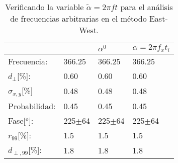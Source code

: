 \begin{table}[H]
    \begin{small}
        \begin{center}
            \begin{tabular}[c]{l|l|l|l|} \cline{2-4}
                                    & \cite{Aab_2020} & $\alpha^0$   & $\alpha=2\pi f_xt_i$   \\ \hline
                \multicolumn{1}{|l|}{Frecuencia:         }& 366.25          &  366.25      &  366.25            \\
                \multicolumn{1}{|l|}{$d_\perp$[\%]:      }& 0.60            &  0.60        &  0.60              \\
                \multicolumn{1}{|l|}{$\sigma_{x,y}$[\%]  }& 0.48            &  0.48        &  0.48              \\ 
                \multicolumn{1}{|l|}{Probabilidad:       }& 0.45            &  0.45        &  0.45              \\
                \multicolumn{1}{|l|}{Fase[$^o$]:         }& 225$\pm$64      &  225$\pm$64  &  225$\pm$64          \\
                \multicolumn{1}{|l|}{$r_{99}$[\%]:       }& 1.5             &  1.5         &  1.5             \\
                \multicolumn{1}{|l|}{$d_{\perp,99}$[\%]: }& 1.8             &  1.8         &  1.8             \\\hline
            \end{tabular}
        \end{center}
        \caption{Verificando la  variable $\tilde{\alpha}=2\pi ft$ para el análisis de frecuencias arbitrarias en el método East-West.}
        \label{tab:comp_vars}
    \end{small}
\end{table}

